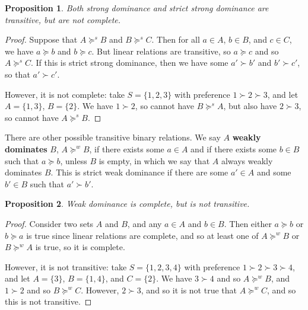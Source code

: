 \documentclass[12pt,letterpaper]{extarticle}
\newtheorem{prop}{Proposition}
\begin{document}
\begin{prop}
Both strong dominance and strict strong dominance are transitive, but are not complete.
\end{prop}

\begin{proof}
Suppose that $A \succcurlyeq^s B$ and $B \succcurlyeq^s C$. Then for all $a\in A$, $b\in B$, and $c\in C$, we have $a \succcurlyeq b$ and $b \succcurlyeq c$. But linear relations are transitive, so $a \succcurlyeq c$ and so $A \succcurlyeq^s C$. If this is strict strong dominance, then we have some $a' \succ b'$ and $b' \succ c'$, so that $a' \succ c'$.

However, it is not complete: take $S = \{1,2,3\}$ with preference $1 \succ 2 \succ 3$, and let $A = \{1,3\}$, $B = \{2\}$. We have $1 \succ 2$, so cannot have $B \succcurlyeq^s A$, but also have $2 \succ 3$, so cannot have $A \succcurlyeq^s B$.
\end{proof}

There are other possible transitive binary relations. We say $A$ \textbf{weakly dominates} $B$, $A \succcurlyeq^w B$, if there exists some $a \in A$ and if there exists some $b \in B$ such that $a \succcurlyeq b$, unless $B$ is empty, in which we say that $A$ always weakly dominates $B$. This is strict weak dominance if there are some $a' \in A$ and some $b' \in B$ such that $a' \succ b'$.

\begin{prop}
Weak dominance is complete, but is not transitive.
\end{prop}

\begin{proof}
Consider two sets $A$ and $B$, and any $a \in A$ and $b \in B$. Then either $a \succcurlyeq b$ or $b \succcurlyeq a$ is true since linear relations are complete, and so at least one of $A \succcurlyeq^w B$ or $B \succcurlyeq^w A$ is true, so it is complete.

However, it is not transitive: take $S = \{1,2,3,4\}$ with preference $1 \succ 2 \succ 3 \succ 4$, and let $A = \{3\}$, $B = \{1,4\}$, and $C = \{2\}$. We have $3 \succ 4$ and so $A \succcurlyeq^w B$, and $1 \succ 2$ and so $B \succcurlyeq^w C$. However, $2 \succ 3$, and so it is not true that $A \succcurlyeq^w C$, and so this is not transitive.
\end{proof}
\end{document}
